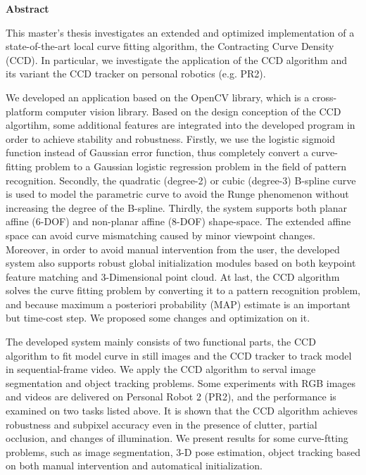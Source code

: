 

\clearemptydoublepage
{}
{}        





\vspace*{2cm}
\begin{center}
{\Large \bf Abstract}
\end{center}
\vspace{1cm}

This master's thesis investigates an extended and optimized
implementation of a state-of-the-art local curve fitting algorithm,
the Contracting Curve Density (CCD).
In particular, we investigate
the application of the CCD algorithm and its variant the CCD tracker
on personal robotics (e.g. PR2).

We developed an application based on the OpenCV library, which
is a cross-platform computer vision library. Based on the
design conception of the CCD algortihm, some
additional features are integrated into the developed program in order to
achieve stability and robustness. Firstly, we use the logistic sigmoid
function instead of Gaussian error function, thus completely convert a
curve-fitting problem to a Gaussian logistic regression problem in the
field of pattern recognition. Secondly, the quadratic (degree-2) or
cubic (degree-3) B-spline curve is used to model the parametric curve
to avoid the Runge phenomenon without increasing the degree of the
B-spline. Thirdly, the system supports both planar affine (6-DOF) and
non-planar affine (8-DOF) shape-space. The extended affine space can avoid
curve mismatching caused by minor viewpoint changes. Moreover, in
order to avoid manual intervention from the user, the developed system
also supports robust global initialization modules based on both keypoint
feature matching and 3-Dimensional point cloud. At last, the CCD
algorithm solves the curve fitting problem by converting it to a
pattern recognition problem, and because maximum a posteriori probability
(MAP) estimate is an important but time-cost step. We proposed some
changes and optimization on it.

The developed system mainly consists of two functional parts, the CCD
algorithm to fit model curve in still images and the CCD tracker to
track model in sequential-frame video. We apply the CCD algorithm to
serval image segmentation and object tracking problems. Some experiments with RGB
images and videos are delivered on Personal Robot 2 (PR2), and the
performance is examined on two tasks listed above.  It is shown that
the CCD algorithm achieves robustness and subpixel accuracy even in the
presence of clutter, partial occlusion, and changes of
illumination. We present results for some curve-ftting problems, such
as image segmentation, 3-D pose estimation, object tracking based on
both manual intervention and automatical initialization.
















